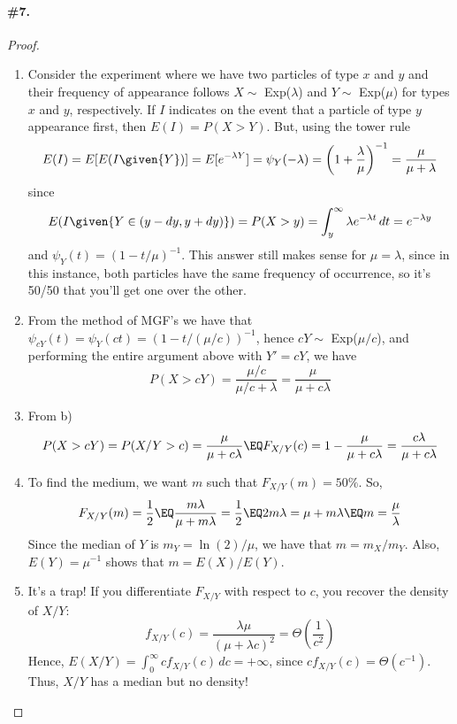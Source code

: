 \documentclass[12pt,titlepage]{article}\usepackage{graphicx, color}
\begin{document}
\paragraph{\#7.}
\begin{proof}
\begin{enumerate}
\item Consider the experiment where we have two particles of type $x$ and $y$ and their frequency of appearance follows $X \sim$ Exp($\lambda$) and $Y \sim$ Exp($\mu$) for types $x$ and $y$, respectively. If $I$ indicates on the event that a particle of type $y$ appearance first, then $E(I) = P(X > Y)$. But, using the tower rule
\[
E(I) = E[E(I \given{Y})] = E[ e^{-\lambda Y} ] = \psi_{Y}(-\lambda) = \left(1 + \frac{\lambda}{\mu}\right)^{-1} = \frac{\mu}{\mu+\lambda}
\]
since
\[
E(I\given{Y\in (y-dy,y+dy) }) = P(X > y) = \int_{y}^{\infty} \lambda e^{-\lambda t} \, dt = e^{-\lambda y} 
\]
and $\psi_{Y}(t) = (1-t/\mu)^{-1}$. This answer still makes sense for $\mu =\lambda$, since in this instance, both particles have the same frequency of occurrence, so it's 50/50 that you'll get one over the other.
\item From the method of MGF's we have that $\psi_{cY}(t) = \psi_{Y}(ct) = (1-t/(\mu/c))^{-1}$, hence $cY \sim$ Exp($\mu/c$), and performing the entire argument above with $Y' = cY$, we have 
\[
P(X > cY) = \frac{\mu/c}{\mu/c+\lambda} = \frac{\mu}{\mu + c\lambda}
\]
\item From b)
\[
P(X > cY) =  P(X/Y > c) = \frac{\mu}{\mu + c\lambda} \EQ F_{X/Y}(c) = 1 - \frac{\mu}{\mu+c\lambda} = \frac{c\lambda}{\mu + c \lambda}
\]
\item To find the medium, we want $m$ such that $F_{X/Y}(m) = 50\%$. So, 
\[
F_{X/Y}(m) = \frac{1}{2} \EQ \frac{m\lambda}{\mu + m\lambda} = \frac{1}{2} \EQ 2m \lambda = \mu + m\lambda \EQ m = \frac{\mu}{\lambda}
\]
Since the median of $Y$ is $m_{Y} = \ln(2)/\mu$, we have that $m = m_{X}/m_{Y}$. Also, $E(Y) = \mu^{-1}$ shows that $m = E(X)/E(Y)$.
\item It's a trap! If you differentiate $F_{X/Y}$ with respect to $c$, you recover the density of $X/Y$:
\[
f_{X/Y}(c) = \frac{\lambda \mu}{(\mu+\lambda c)^2} = \Theta\left(\frac{1}{c^2}\right)
\]
Hence, $E(X/Y) = \int_{0}^{\infty} c f_{X/Y}(c) \, dc = + \infty$, since $c f_{X/Y}(c) = \Theta(c^{-1})$. Thus, $X/Y$ has a median but no density!
\end{enumerate}
\end{proof}
\end{document}
